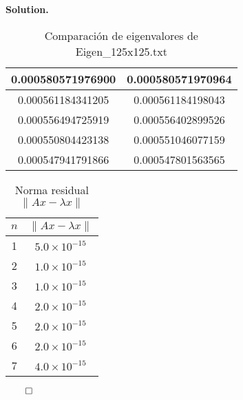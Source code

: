 \documentclass{article}
\theoremstyle{problemstyle}
\newenvironment{solution}{%
  \begin{mdframed}[linewidth=0.8pt,linecolor=Gray,backgroundcolor=Gray!5,roundcorner=5pt]%
  \noindent\textbf{Solution.}%
}{%
\hfill $ \qed $ 
  \end{mdframed}%
}
\begin{document}
\begin{solution}
\begin{enumerate}
\begin{table}[H]
\begin{center}
\begin{tabular}{|c|c|}
					      0.000580571976900
					                        &
					      0.000580571970964
					      \\
					      \hline

					      0.000561184341205
					                        &
					      0.000561184198043
					      \\
					      \hline

					      0.000556494725919
					                        &
					      0.000556402899526
					      \\
					      \hline

					      0.000550804423138
					                        &
					      0.000551046077159
					      \\
					      \hline

					      0.000547941791866
					                        &
					      0.000547801563565
					      \\
					      \hline
				      \end{tabular}
			      \end{center}
			      \caption{Comparaci\'on de eigenvalores de Eigen\_125x125.txt}\label{tab:evals125x125}
		      \end{table}
		      \begin{table}[H]
			      \centering
			      \begin{tabular}{|c|c|}
				      \hline
				      $n$ & $\lVert Ax - \lambda x \rVert$ \\
				      \hline
				      1   & $5.0 \times 10^{-15}$          \\
				      \hline
				      2   & $1.0 \times 10^{-15}$          \\
				      \hline
				      3   & $1.0 \times 10^{-15}$          \\
				      \hline
				      4   & $2.0 \times 10^{-15}$          \\
				      \hline
				      5   & $2.0 \times 10^{-15}$          \\
				      \hline
				      6   & $2.0 \times 10^{-15}$          \\
				      \hline
				      7   & $4.0 \times 10^{-15}$          \\
				      \hline
			      \end{tabular}
			      \caption{Norma residual $\lVert Ax - \lambda x \rVert$}
		      \end{table}
	\end{enumerate}
\end{solution}
\end{document}
